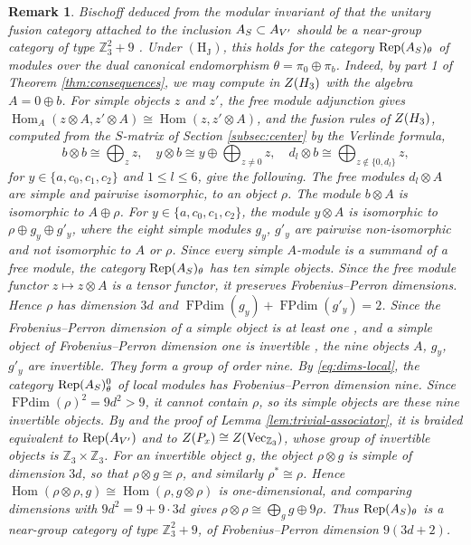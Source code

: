 \documentclass[leqno]{article}
\let\cal\relax
\newcommand{\cal}{\mathcal}
\newcommand{\Z}{\ensuremath{\mathbb{Z}}}
\renewcommand{\leq}{\ensuremath{\leqslant}}
\newcommand{\ot}{\otimes}
\DeclareMathOperator{\Rep}{Rep} %
\newtheorem{remark}[thm]{Remark}
\numberwithin{equation}{section}
\begin{document}
\begin{remark}\normalfont
\label{rem:near-group}
Bischoff deduced from the modular invariant of \cite[(2.4) p.~20]{EvG11} that the unitary fusion category attached to the inclusion $\cal A_S \subset \cal A_{V'}$ should be a near-group category of type $\Z_3^2+9$ \cite[Remark 5.14 and Proposition 5.15 p.~31]{Bis17b}. Under $\mathrm{(H_J)}$, this holds for the category $\Rep(\cal A_S)_\theta$ of modules over the dual canonical endomorphism $\theta = \pi_0 \oplus \pi_b$. Indeed, by part 1 of Theorem \ref{thm:consequences}, we may compute in $Z(\cal H_3)$ with the algebra $A = 0 \oplus b$. For simple objects $z$ and $z'$, the free module adjunction gives $\operatorname{Hom}_A(z \ot A,z' \ot A) \cong \operatorname{Hom}(z,z' \ot A)$, and the fusion rules of $Z(\cal H_3)$, computed from the $S$-matrix of Section \ref{subsec:center} by the Verlinde formula,
\[
b \ot b \cong \bigoplus_z z,\quad y \ot b \cong y \oplus \bigoplus_{z \neq 0} z,\quad d_l \ot b \cong \bigoplus_{z \notin \{0,d_l\}} z,
\]
for $y \in \{a,c_0,c_1,c_2\}$ and $1 \leq l \leq 6$, give the following. The free modules $d_l \ot A$ are simple and pairwise isomorphic, to an object $\rho$. The module $b \ot A$ is isomorphic to $A \oplus \rho$. For $y \in \{a,c_0,c_1,c_2\}$, the module $y \ot A$ is isomorphic to $\rho \oplus g_y \oplus g'_y$, where the eight simple modules $g_y$, $g'_y$ are pairwise non-isomorphic and not isomorphic to $A$ or $\rho$. Since every simple $A$-module is a summand of a free module, the category $\Rep(\cal A_S)_\theta$ has ten simple objects. Since the free module functor $z \mapsto z \ot A$ is a tensor functor, it preserves Frobenius--Perron dimensions. Hence $\rho$ has dimension $3d$ and $\operatorname{FPdim}(g_y)+\operatorname{FPdim}(g'_y) = 2$. Since the Frobenius--Perron dimension of a simple object is at least one \cite[Proposition 3.3.4 p.~53]{EGNO15}, and a simple object of Frobenius--Perron dimension one is invertible \cite[Corollary 3.3.10 p.~54]{EGNO15}, the nine objects $A$, $g_y$, $g'_y$ are invertible. They form a group of order nine. By \eqref{eq:dims-local}, the category $\Rep(\cal A_S)^0_\theta$ of local modules has Frobenius--Perron dimension nine. Since $\operatorname{FPdim}(\rho)^2 = 9d^2 > 9$, it cannot contain $\rho$, so its simple objects are these nine invertible objects. By \cite[Proposition 6.4 p.~33]{BKL15} and the proof of Lemma \ref{lem:trivial-associator}, it is braided equivalent to $\Rep(\cal A_{V'})$ and to $Z(\cal P_x) \cong Z(\mathrm{Vec}_{\Z_3})$, whose group of invertible objects is $\Z_3 \times \Z_3$. For an invertible object $g$, the object $\rho \ot g$ is simple of dimension $3d$, so that $\rho \ot g \cong \rho$, and similarly $\rho^* \cong \rho$. Hence $\operatorname{Hom}(\rho \ot \rho,g) \cong \operatorname{Hom}(\rho,g \ot \rho)$ is one-dimensional, and comparing dimensions with $9d^2 = 9+9 \cdot 3d$ gives $\rho \ot \rho \cong \bigoplus_g g \oplus 9\rho$. Thus $\Rep(\cal A_S)_\theta$ is a near-group category of type $\Z_3^2+9$, of Frobenius--Perron dimension $9(3d+2)$.
\end{remark}
\end{document}
